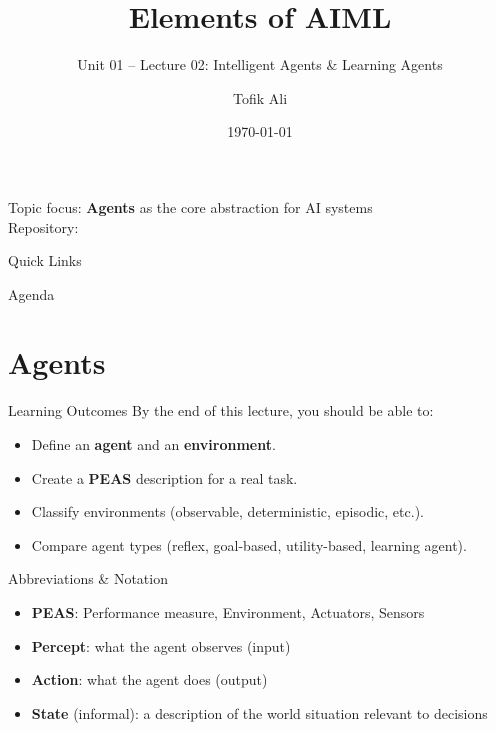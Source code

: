 \documentclass[aspectratio=169]{beamer}
\title[Elements of AIML]{Elements of AIML}
\subtitle{Unit 01 -- Lecture 02: Intelligent Agents \& Learning Agents}
\author{Tofik Ali}
\institute{School of Computer Science, UPES Dehradun}
\date{\today}
\begin{document}
\UPESCoverFrame
\setcounter{framenumber}{0}

\begin{frame}
  \titlepage
  \vspace{0.3em}
  \begin{center}
    \footnotesize Topic focus: \textbf{Agents} as the core abstraction for AI systems\\[0.25em]
    \footnotesize Repository: \texttt{\AIMLRepoURL}
  \end{center}
  \slidesources{\AIMLUnitISources}
\end{frame}

\begin{frame}{Quick Links}
  \centering
  \hyperlink{sec:agents}{}\hspace{0.6em}
  \hyperlink{sec:peas}{}\hspace{0.6em}
  \hyperlink{sec:env}{}\hspace{0.6em}
  \hyperlink{sec:types}{}\hspace{0.6em}
  \hyperlink{sec:learn}{}
\end{frame}

\begin{frame}{Agenda}
  \tableofcontents
\end{frame}

\section{Agents}
\label{sec:agents}

\begin{frame}{Learning Outcomes}
  By the end of this lecture, you should be able to:
  \begin{itemize}[<+->]
    \item Define an \textbf{agent} and an \textbf{environment}.
    \item Create a \textbf{PEAS} description for a real task.
    \item Classify environments (observable, deterministic, episodic, etc.).
    \item Compare agent types (reflex, goal-based, utility-based, learning agent).
  \end{itemize}
\end{frame}

\begin{frame}{Abbreviations \& Notation}
  \begin{itemize}[<+->]
    \item \textbf{PEAS}: Performance measure, Environment, Actuators, Sensors
    \item \textbf{Percept}: what the agent observes (input)
    \item \textbf{Action}: what the agent does (output)
    \item \textbf{State} (informal): a description of the world situation relevant to decisions
  \end{itemize}
\end{frame}
\end{document}
